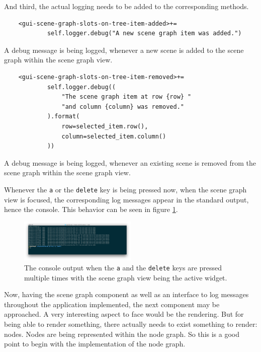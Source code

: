 \documentclass[10pt, openright, notitlepage]{scrreprt}
\begin{document}
And third, the actual logging needs to be added to the corresponding methods.

\begin{listing}[H]
\begin{verbatim}
    <gui-scene-graph-slots-on-tree-item-added>+=
            self.logger.debug("A new scene graph item was added.")
\end{verbatim}
\caption{\label{lst:gui-scene-graph-slots-on-tree-item-added-logging}
A debug message is being logged, whenever a new scene is added to the scene graph within the scene graph view.}
\end{listing}

\begin{listing}[H]
\begin{verbatim}
    <gui-scene-graph-slots-on-tree-item-removed>+=
            self.logger.debug((
                "The scene graph item at row {row} "
                "and column {column} was removed."
            ).format(
                row=selected_item.row(),
                column=selected_item.column()
            ))
\end{verbatim}
\caption{\label{lst:gui-scene-graph-slots-on-tree-item-removed-logging}
A debug message is being logged, whenever an existing scene is removed from the scene graph within the scene graph view.}
\end{listing}

Whenever the \texttt{a} or the \texttt{delete} key is being pressed now, when the scene graph
view is focused, the corresponding log messages appear in the standard output,
hence the console. This behavior can be seen in figure \ref{fig:editor-alpha-04}.

\begin{figure}[H]
\centering
\includegraphics[width=0.5\textwidth]{./images/qde_alpha_04.png}
\caption{\label{fig:editor-alpha-04}
The console output when the \texttt{a} and the \texttt{delete} keys are pressed multiple times with the scene graph view being the active widget.}
\end{figure}

Now, having the scene graph component as well as an interface to log messages
throughout the application implemented, the next component may be approached. A
very interesting aspect to face would be the rendering. But for being able to
render something, there actually needs to exist something to render: nodes.
Nodes are being represented within the node graph. So this is a good point to
begin with the implementation of the node graph.
\end{document}
